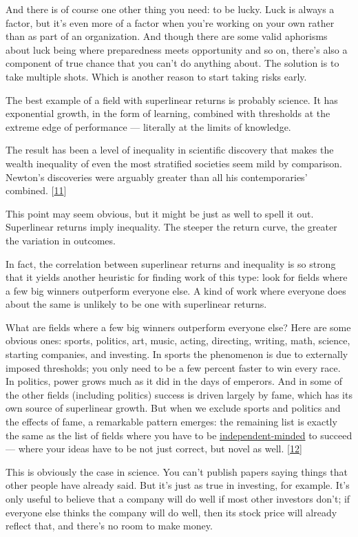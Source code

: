 And there is of course one other thing you need: to be lucky. Luck is
always a factor, but it's even more of a factor when you're working on
your own rather than as part of an organization. And though there are
some valid aphorisms about luck being where preparedness meets
opportunity and so on, there's also a component of true chance that you
can't do anything about. The solution is to take multiple shots. Which
is another reason to start taking risks early.

The best example of a field with superlinear returns is probably
science. It has exponential growth, in the form of learning, combined
with thresholds at the extreme edge of performance --- literally at the
limits of knowledge.

The result has been a level of inequality in scientific discovery that
makes the wealth inequality of even the most stratified societies seem
mild by comparison. Newton's discoveries were arguably greater than all
his contemporaries' combined. {[}\hyperref[f11n]{11}{]}

This point may seem obvious, but it might be just as well to spell it
out. Superlinear returns imply inequality. The steeper the return curve,
the greater the variation in outcomes.

In fact, the correlation between superlinear returns and inequality is
so strong that it yields another heuristic for finding work of this
type: look for fields where a few big winners outperform everyone else.
A kind of work where everyone does about the same is unlikely to be one
with superlinear returns.

What are fields where a few big winners outperform everyone else? Here
are some obvious ones: sports, politics, art, music, acting, directing,
writing, math, science, starting companies, and investing. In sports the
phenomenon is due to externally imposed thresholds; you only need to be
a few percent faster to win every race. In politics, power grows much as
it did in the days of emperors. And in some of the other fields
(including politics) success is driven largely by fame, which has its
own source of superlinear growth. But when we exclude sports and
politics and the effects of fame, a remarkable pattern emerges: the
remaining list is exactly the same as the list of fields where you have
to be \href{think.html}{independent-minded} to succeed --- where your
ideas have to be not just correct, but novel as well.
{[}\hyperref[f12n]{12}{]}

This is obviously the case in science. You can't publish papers saying
things that other people have already said. But it's just as true in
investing, for example. It's only useful to believe that a company will
do well if most other investors don't; if everyone else thinks the
company will do well, then its stock price will already reflect that,
and there's no room to make money.

